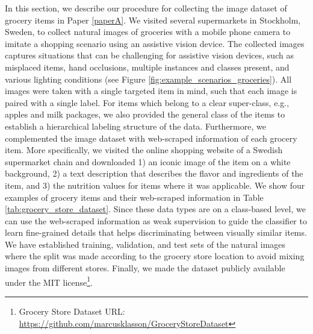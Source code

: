 In this section, we describe our procedure for collecting the image dataset of grocery items in Paper \ref{paperA}. We visited several supermarkets in Stockholm, Sweden, to collect natural images of groceries with a mobile phone camera to imitate a shopping scenario using an assistive vision device. The collected images captures situations that can be challenging for assistive vision devices, such as misplaced items, hand occlusions, multiple instances and classes present, and various lighting conditions (see Figure \ref{fig:example_scenarios_groceries}). All images were taken with a single targeted item in mind, such that each image is paired with a single label. For items which belong to a clear super-class, e.g., apples and milk packages, we also provided the general class of the items to establish a hierarchical labeling structure of the data. Furthermore, we complemented the image dataset with web-scraped information of each grocery item. More specifically, we visited the online shopping website of a Swedish supermarket chain and downloaded 1) an iconic image of the item on a white background, 2) a text description that describes the flavor and ingredients of the item, and 3) the nutrition values for items where it was applicable. We show four examples of grocery items and their web-scraped information in Table \ref{tab:grocery_store_dataset}. Since these data types are on a class-based level, we can use the web-scraped information as weak supervision to guide the classifier to learn fine-grained details that helps discriminating between visually similar items. We have established training, validation, and test sets of the natural images where the split was made according to the grocery store location to avoid mixing images from different stores. Finally, we made the dataset publicly available under the MIT license\footnote{Grocery Store Dataset URL: \url{https://github.com/marcusklasson/GroceryStoreDataset}}.



